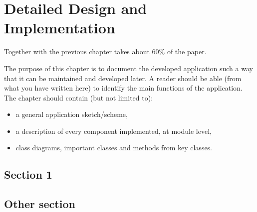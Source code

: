 \chapter{Detailed Design and Implementation}
\pagestyle{fancy}

{\color{blue}Together with the previous chapter takes about 60\% of the paper.\\}

The purpose of this chapter is to document the developed application such a way that it can be maintained and developed later. A reader should be able (from what you have written here) to identify the main functions of the application.
The chapter should contain (but not limited to):
\begin{itemize}
	\item a general application sketch/scheme,
	\item a description of every component implemented, at module level,
	\item class diagrams, important classes and methods from key classes.
\end{itemize}

\section{Section 1}
\section{Other section}
\lipsum[10-20]